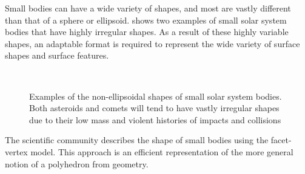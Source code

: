 Small bodies can have a wide variety of shapes, and most are vastly different than that of a sphere or ellipsoid.
 shows two examples of small solar system bodies that have highly irregular shapes.
As a result of these highly variable shapes, an adaptable format is required to represent the wide variety of surface shapes and surface features.
\begin{figure}[h]
    \centering
    ~
    \caption{Examples of the non-ellipsoidal shapes of small solar system bodies. Both asteroids and comets will tend to have vastly irregular shapes due to their low mass and violent histories of impacts and collisions~\label{fig:irregular_asteroids}}
\end{figure}
The scientific community describes the shape of small bodies using the facet-vertex model.
This approach is an efficient representation of the more general notion of a polyhedron from geometry.

